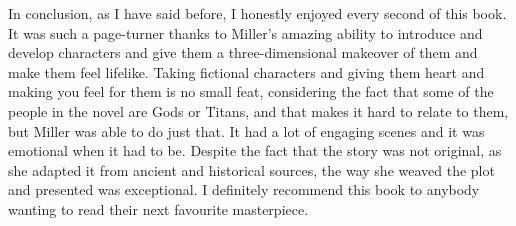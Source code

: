 \documentclass[12pt, a4paper]{article}
\begin{document}
In conclusion, as I have said before, I honestly enjoyed every second of this book. It was such a page-turner thanks to Miller's amazing ability to introduce and develop characters and give them a three-dimensional makeover of them and make them feel lifelike. Taking fictional characters and giving them heart and making you feel for them is no small feat, considering the fact that some of the people in the novel are Gods or Titans, and that makes it hard to relate to them, but Miller was able to do just that.  It had a lot of engaging scenes and it was emotional when it had to be. Despite the fact that the story was not original, as she adapted it from ancient and historical sources, the way she weaved the plot and presented was exceptional. I definitely recommend this book to anybody wanting to read their next favourite masterpiece.

\newpage
\printbibliography
\end{document}
